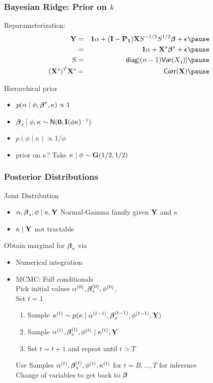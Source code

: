 \documentclass[handout]{beamer}\usepackage[]{graphicx}\usepackage[]{color}
\begin{document}
\begin{frame}
  \frametitle{Bayesian Ridge: Prior on $k$}
  Reparameterization:
  \begin{eqnarray*}
  \Y  & =  &\one \alpha + (\I - \P_{\one}) \X S^{-1/2} S^{1/2} \b +
  \eps   \pause \\
      & = & \one \alpha + \X^s \b^s + \eps \pause\\
  S & = &\textsf{diag}[ (n-1) \Var(X_j) ]  \pause \\
  (\X^s)^T \X^s & = & \textsf{Corr}(\X) \pause
  \end{eqnarray*}

Hierarchical prior \pause
\begin{itemize}
\item $p(\alpha \mid \phi, \boldsymbol{\beta}^s, \kappa) \propto 1$ \pause
\item $\boldsymbol{\beta}_s \mid \phi, \kappa \sim \textsf{N}(\mathbf{0}, \mathbf{I} (\phi \kappa )^{-1})$ \pause
\item $p(\phi \mid \kappa) \propto 1/\phi$
\item prior on $\kappa$?  Take $\kappa \mid \phi \sim  \mathbf{G}(1/2, 1/2)$ \pause
\end{itemize}
\end{frame}
\begin{frame}
  \frametitle{Posterior Distributions}
Joint Distribution
  \begin{itemize}
  \item $\alpha, \boldsymbol{\beta}_s, \phi \mid \kappa, \mathbf{Y}$  Normal-Gamma family given $\mathbf{Y}$
    and $\kappa$ \pause
  \item $\kappa \mid \mathbf{Y}$  not tractable \pause
  \end{itemize}
Obtain marginal for  $\boldsymbol{\beta}_s$ via  \pause
\begin{itemize}
\item Numerical integration \pause
\item MCMC:  Full conditionals \pause \\  Pick initial values $\alpha^{(0)}, \boldsymbol{\beta}_s^{(0)},
  \phi^{(0)}$, \pause \\
  Set  $t = 1$
  \begin{enumerate}
  \item Sample $\kappa^{(t)} \sim p(\kappa \mid \alpha^{(t-1)},
    \boldsymbol{\beta}_s^{(t-1)}, \phi^{(t-1)}, \mathbf{Y})$ \pause
   \item Sample $\alpha^{(t)}, \boldsymbol{\beta}_s^{(t)}, \phi^{(t)} \mid \kappa^{(t)},
     \mathbf{Y}$ \pause
 \item Set $t = t + 1$ and repeat until $t > T$ \pause
  \end{enumerate}
Use Samples  $\alpha^{(t)}, \boldsymbol{\beta}_s^{(t)}, \phi^{(t)}, \kappa^{(t)}$ for $t
= B, \ldots, T$ for inference \\
Change of variables to get back to $\boldsymbol{\beta}$
\end{itemize}
\end{frame}
\end{document}
